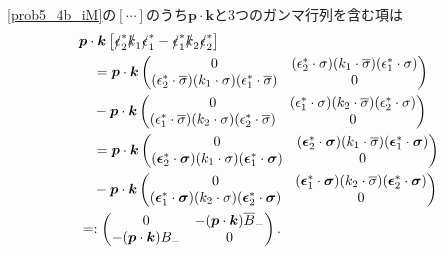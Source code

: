 \eqref{prob5_4b_iM}の$[\cdots]$のうち$\boldsymbol{p}\cdot\boldsymbol{k}$と3つのガンマ行列を含む項は
\begin{align*}
  & \boldsymbol{p} \cdot \boldsymbol{k}\left[ \slashed{\epsilon}_2^\ast\slashed{k}_1\slashed{\epsilon}_1^\ast - \slashed{\epsilon}_1^\ast\slashed{k}_2\slashed{\epsilon}_2^\ast \right] \\
  &\quad = \boldsymbol{p} \cdot \boldsymbol{k}
  \begin{pmatrix}
    0 & (\epsilon_2^\ast \cdot \sigma)(k_1 \cdot \overline\sigma)(\epsilon_1^\ast \cdot \sigma) \\
    (\epsilon_2^\ast \cdot \overline\sigma)(k_1 \cdot \sigma)(\epsilon_1^\ast \cdot \overline\sigma) & 0
  \end{pmatrix}
  \\
  & \quad - \boldsymbol{p} \cdot \boldsymbol{k}
  \begin{pmatrix}
    0 & (\epsilon_1^\ast \cdot \sigma)(k_2 \cdot \overline\sigma)(\epsilon_2^\ast \cdot \sigma) \\
    (\epsilon_1^\ast \cdot \overline\sigma)(k_2 \cdot \sigma)(\epsilon_2^\ast \cdot \overline\sigma) & 0
  \end{pmatrix}
  \\
  &\quad = \boldsymbol{p} \cdot \boldsymbol{k}
  \begin{pmatrix}
    0 & (\boldsymbol{\epsilon}_2^\ast \cdot \boldsymbol\sigma)(k_1 \cdot \overline\sigma)(\boldsymbol{\epsilon}_1^\ast \cdot \boldsymbol\sigma) \\
    (\boldsymbol{\epsilon}_2^\ast \cdot \boldsymbol\sigma)(k_1 \cdot \sigma)(\boldsymbol{\epsilon}_1^\ast \cdot \boldsymbol\sigma) & 0
  \end{pmatrix}
  \\
  & \quad - \boldsymbol{p} \cdot \boldsymbol{k}
  \begin{pmatrix}
    0 & (\boldsymbol{\epsilon}_1^\ast \cdot \boldsymbol\sigma)(k_2 \cdot \overline\sigma)(\boldsymbol{\epsilon}_2^\ast \cdot \boldsymbol\sigma) \\
    (\boldsymbol{\epsilon}_1^\ast \cdot \boldsymbol\sigma)(k_2 \cdot \sigma)(\boldsymbol{\epsilon}_2^\ast \cdot \boldsymbol\sigma) & 0
  \end{pmatrix}
  \\
  &=:
  \begin{pmatrix}
    0 & -(\boldsymbol{p} \cdot \boldsymbol{k})\overline{B}_- \\
    -(\boldsymbol{p} \cdot \boldsymbol{k}) B_- & 0
  \end{pmatrix}
  .
\end{align*}

